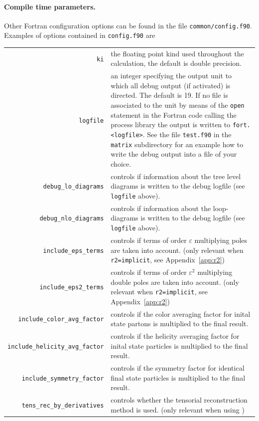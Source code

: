 \paragraph{Compile time parameters.}
Other Fortran configuration options can be found in the file \texttt{common/config.f90}.
\smallskip
Examples of options contained in \texttt{config.f90} are

\begin{longtable}{r p{}}
\texttt{ki} & the floating point kind used throughout the calculation, the default is double precision.\\
\texttt{logfile} & an integer specifying the output unit to which all debug output (if activated) is directed. The default is 19. If no file is associated to the unit by means of the \texttt{open} statement in the Fortran code calling the process library the output is written to \texttt{fort.<logfile>}. See the file \texttt{test.f90} in the \texttt{matrix} subdirectory for an example how to write the debug output into a file of your choice.\\
\texttt{debug\_lo\_diagrams} & controls if information about the
    tree level diagrams is written to the debug logfile (see \texttt{logfile} above).\\
\texttt{debug\_nlo\_diagrams} & controls if information about the
    loop-diagrams is written to the debug logfile (see \texttt{logfile} above).\\
\texttt{include\_eps\_terms} & controls if
    terms of order $\varepsilon$ multiplying
    poles are taken into account. (only relevant when \texttt{r2=implicit}, see Appendix~\ref{app:r2})\\
\texttt{include\_eps2\_terms} & controls if
    terms of order $\varepsilon^2$ multiplying
    double poles are taken into account. (only relevant when \texttt{r2=implicit}, see Appendix~\ref{app:r2})\\
\texttt{include\_color\_avg\_factor} & controls if the color averaging
    factor for inital state partons is multiplied to the final result.\\
\texttt{include\_helicity\_avg\_factor} & controls if the helicity averaging
    factor for inital state particles is multiplied to the final result.\\
\texttt{include\_symmetry\_factor} & controls if the symmetry
    factor for identical final state particles
    is multiplied to the final result. \\
\texttt{tens\_rec\_by\_derivatives} & controls whether the tensorial reconstruction method is used. (only relevant when using \golemVC{})
\end{longtable}

